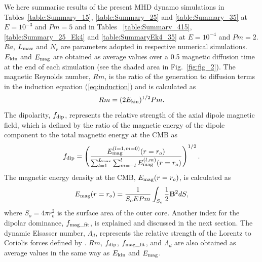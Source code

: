 %
We here summarise results of the present MHD dynamo simulations in Tables~\ref{table:Summary_15}, \ref{table:Summary_25} and \ref{table:Summary_35} at $E = 10^{-3}$ and $Pm = 5$ and in  Tables ~\ref{table:Summary_415}, \ref{table:Summary_25_Ek4} and \ref{table:SummaryEk4_35} at $E = 10^{-4}$ and $Pm = 2$.
%
%
$Ra$, $L_{\rm max}$ and $N_r$ are parameters adopted in respective numerical simulations.
$E_{\rm kin}$ and $E_{\rm mag}$ are obtained as average values over a 0.5 magnetic diffusion time at the end of each simulation (see the shaded area in Fig.~\ref{fig:fig_2}).
The magnetic Reynolds number, $Rm$, is the ratio of the generation to diffusion terms in the induction equation (\ref{eq:induction}) and is calculated as
%
\begin{equation}
Rm = (2 E_{\rm kin})^{1/2} Pm .
\label{eq:Rm}
\end{equation}
%
The dipolarity, $f_{\rm dip}$, represents the relative strength of the axial dipole magnetic field, which is defined by the ratio of the magnetic energy of the dipole component to the total magnetic energy at the CMB as
%
%
\begin{equation}
f_{\rm dip} = 
\left(
\frac{E_{\rm mag}^{(l=1,m=0)} (r=r_o)}
     {\sum_{l=1}^{L_{\rm max}}
      \sum_{m=-l}^l E_{\rm mag}^{(l,m)} (r=r_o)}
\right)^{1/2}.
\label{eq:f_dip}
\end{equation}
%
The magnetic energy density at the CMB, $E_{\rm mag} (r=r_o)$, is calculated as
%
\begin{equation}
E_{\rm mag} (r=r_o) = 
  \frac{1}{S_o E Pm} \int_{S_o} \frac{1}{2} \vec{B}^2 dS,
\end{equation}
%
where $S_o = 4\pi r_o^2$ is the surface area of the outer core.
Another index for the dipolar dominance, $f_{\rm mag\_fit}$, is explained and discussed in the next section.
The dynamic Elsasser number, $\Lambda_d$, represents the relative strength of the Lorentz to Coriolis forces defined by \citet{Soderlund:2012}.
$Rm$, $f_{\rm dip}$, $f_{\rm mag\_fit}$, and $\Lambda_d$ are also obtained as average values in the same way as $E_{\rm kin}$ and $E_{\rm mag}$.



